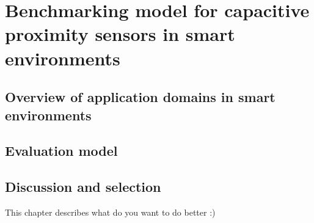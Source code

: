 \chapter{Benchmarking model for capacitive proximity sensors in smart environments} \label{ch:benchmark}
\section{Overview of application domains in smart environments}
\section{Evaluation model}
\section{Discussion and selection}

This chapter describes what do you want to do better :)